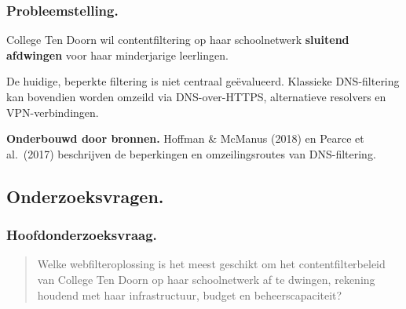 \documentclass[aspectratio=169]{beamer}
\begin{document}
\begin{frame}
    \frametitle{Probleemstelling.}

    College Ten Doorn wil contentfiltering op haar schoolnetwerk
    \textbf{sluitend afdwingen} voor haar minderjarige leerlingen.

    \bigskip

    De huidige, beperkte filtering is niet centraal geëvalueerd.
    Klassieke DNS-filtering kan bovendien worden omzeild via
    DNS-over-HTTPS, alternatieve resolvers en VPN-verbindingen.

    \bigskip
    \bigskip

    \textcolor{hggrey}{\textbf{Onderbouwd door bronnen.}} Hoffman \&
    McManus (2018) en Pearce et al.\ (2017) beschrijven de beperkingen en
    omzeilingsroutes van DNS-filtering.
\end{frame}

\subsection{Onderzoeksvragen.}

\begin{frame}
    \frametitle{Hoofdonderzoeksvraag.}

    \begin{quote}
        {\large Welke webfilteroplossing is het meest geschikt om het
        contentfilterbeleid van College Ten Doorn op haar schoolnetwerk af
        te dwingen, rekening houdend met haar infrastructuur, budget en
        beheerscapaciteit?}
    \end{quote}

    \bigskip

\end{frame}
\end{document}
